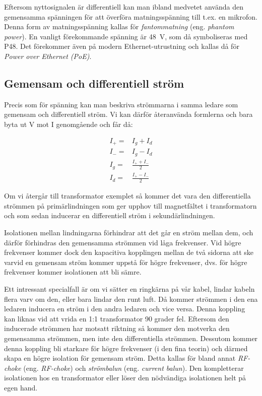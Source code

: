 Eftersom nyttosignalen är differentiell kan man ibland medvetet använda den
gemensamma spänningen för att överföra matningsspänning till t.ex. en mikrofon.
Denna form av matningsspänning kallas för \emph{fantommatning}
(eng. \emph{phantom power}). En vanligt förekommande spänning är 48~V, som då
symboliseras med P48. Det förekommer även på modern Ethernet-utrustning och
kallas då för \emph{Power over Ethernet (PoE)}.

\subsection{Gemensam och differentiell ström}
\label{comdiffi}

Precis som för spänning kan man beskriva strömmarna i samma ledare som
gemensam och differentiell ström. Vi kan därför återanvända formlerna och bara
byta ut V mot I genomgående och får då:

\begin{eqnarray}
I_+ = & I_g + I_d\\
I_- = & I_g - I_d\\
I_g = & \frac{I_+ + I_-}{2}\\
I_d = & \frac{I_+ - I_-}{2}
\end{eqnarray}

Om vi återgår till transformator exemplet så kommer det vara den differentiella
strömmen på primärlindningen som ger upphov till magnetfältet i transformatorn
och som sedan inducerar en differentiell ström i sekundärlindningen.

Isolationen mellan lindningarna förhindrar att det går en ström mellan dem,
och därför förhindras den gemensamma strömmen vid låga frekvenser. Vid högre
frekvenser kommer dock den kapacitiva kopplingen mellan de två sidorna att
ske varvid en gemensam ström kommer uppstå för högre frekvenser, dvs. för
högre frekvenser kommer isolationen att bli sämre.

Ett intressant specialfall är om vi sätter en ringkärna på vår kabel, lindar
kabeln flera varv om den, eller bara lindar den runt luft. Då kommer strömmen
i den ena ledaren inducera en ström i den andra ledaren och vice versa.
Denna koppling kan liknas vid att vrida en 1:1 transformator 90 grader fel.
Eftersom den inducerade strömmen har motsatt riktning så kommer den motverka
den gemensamma strömmen, men inte den differentiella strömmen. Dessutom kommer
denna koppling bli starkare för högre frekvenser (i den fina teorin) och
därmed skapa en högre isolation för gemensam ström. Detta kallas för
bland annat \emph{RF-choke} (eng. \emph{RF-choke}) och \emph{strömbalun} (eng.
\emph{current balun}). Den kompletterar isolationen hos en transformator
eller löser den nödvändiga isolationen helt på egen hand.

